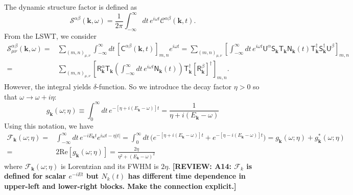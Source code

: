 \documentclass[aps, prx, nofootinbib, superscriptaddress]{revtex4-2}
\newcommand{\REVIEW}[1]{{\color{reviewcolor}\bfseries [REVIEW: #1]}}
\newcommand{\kvec}{\mathbf{k}}
\begin{document}
The dynamic structure factor is defined as 
\begin{equation}
    \mathcal{S}^{\alpha\beta}(\kvec, \omega) 
    = \frac{1}{2\pi} \int_{-\infty}^{\infty} d t \, e^{i \omega t} \mathcal{C}^{\alpha\beta} (\kvec, t).
\end{equation}
From the LSWT, we consider 
\begin{align*}
    \mathcal{S}^{\alpha\beta}_{\mu\nu} (\mathbf{k}, \omega) 
    = & \sum_{(m,n)_{\mu,\nu}} \int_{-\infty}^{\infty} dt \, [\mathsf{C}^{\alpha\beta} (\kvec, t)]_{m,n} e^{i \omega t}
    = \sum_{(m,n)_{\mu,\nu}} 
    \left[ 
    \int_{-\infty}^{\infty} dt \, e^{i \omega t} 
    \mathsf{U}^{\alpha} 
    \mathsf{S}_{\kvec}^{\phantom \dagger} 
    \mathsf{T}_{\kvec}^{\phantom \dagger} 
    \mathsf{N}_{\kvec}^{\phantom \dagger}  (t)
    \mathsf{T}_{\kvec}^{         \dagger}
    \mathsf{S}_{\kvec}^{         \dagger}
    \mathsf{U}^{\beta}
    \right]_{m,n}  \\
    = & \sum_{(m,n)_{\mu,\nu}} 
    \left[  \mathsf{R}^{\alpha}_{\kvec} \mathsf{T}_{\kvec}
    \left( \int_{-\infty}^{\infty} dt \, e^{i \omega t} \mathsf{N}_{\kvec} (t) \right)
    \mathsf{T}_{\kvec}^{\dagger} [\mathsf{R}^{\beta}_{\kvec}]^{\dagger} \right]_{m,n}.
\end{align*}
However, the integral yields $\delta$-function. So we introduce the decay factor $\eta > 0$ so that $\omega \rightarrow \omega + i \eta$:
\begin{equation}
    g_{\kvec} ( \omega ; \eta ) 
    \equiv \int_{0}^{\infty} dt \, e^{ - [ \eta  + i( E_{\kvec} - \omega ) ] t} 
    = \frac{1}{\eta + i ( E_{\kvec} - \omega )}
\end{equation}
Using this notation, we have
\begin{align}
    \mathcal{F}_{\kvec} (\omega; \eta) = & \int_{-\infty}^{\infty} dt\, e^{-i E_{\kvec} t} e^{ i\omega t - \eta |t|} 
    =  \int_{0}^{\infty} dt \, 
    \big( e^{ - [ \eta  + i( E_{\kvec} - \omega ) ] t} + e^{ - [ \eta  - i( E_{\kvec} - \omega ) ] t} \big) 
    =  g_{\kvec} ( \omega ; \eta ) + g_{\kvec}^{*} ( \omega ; \eta ) \\
    = & 2 \mathrm{Re} [ g_{\kvec} ( \omega ; \eta ) ]
    = \frac{2\eta}{\eta^{2} + ( E_{\kvec} - \omega )^{2}}
\end{align}
where $\mathcal{F}_{\kvec}(\omega; \eta)$ is Lorentzian and its FWHM is $2\eta$.
\REVIEW{A14: $\mathcal{F}_k$ is defined for scalar $e^{-iEt}$ but $N_k(t)$ has different time dependence in upper-left and lower-right blocks. Make the connection explicit.}
\end{document}
